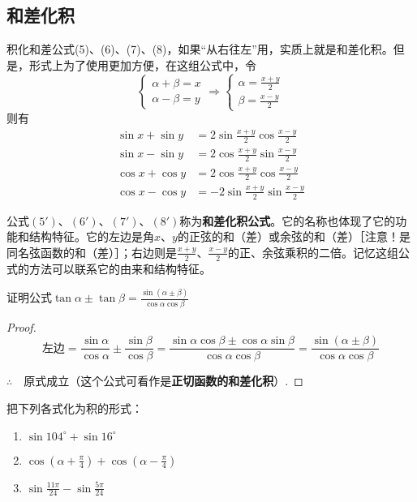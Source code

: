 \subsection{和差化积}
积化和差公式(5)、(6)、(7)、(8)，如果“从右往左”用，实质上就是和差化积。但是，形式上为了使用更加方便，在这组公式中，令
\[\begin{cases}
    \alpha+\beta=x\\
    \alpha-\beta=y
\end{cases}\Rightarrow \begin{cases}
    \alpha=\frac{x+y}{2}\\[1.5ex]
    \beta=\frac{x-y}{2}
\end{cases}\]
则有
\begin{align}
\sin x +\sin y&=2\sin\frac{x+y}{2}\cos\frac{x-y}{2} \tag{$5'$}\\
\sin x -\sin y&=2\cos\frac{x+y}{2}\sin\frac{x-y}{2} \tag{$6'$}\\
\cos x +\cos y&=2\cos\frac{x+y}{2}\cos\frac{x-y}{2} \tag{$7'$}\\
\cos x -\cos y&=-2\sin\frac{x+y}{2}\sin\frac{x-y}{2} \tag{$8'$}
\end{align}

公式$(5')$、$(6')$、$(7')$、$(8')$称为\textbf{和差化积公式}。它的名称也体现了它的功能和结构特征。它的左边是角$x$、$y$的正弦的和（差）或余弦的和（差）［注意！是同名弦函数的和（差）］；右边则是$\frac{x+y}{2}$、$\frac{x-y}{2}$的正、余弦乘积的二倍。记忆这组公式的方法可以联系它的由来和结构特征。

\begin{example}
证明公式$\tan\alpha\pm\tan\beta = \frac{\sin(\alpha\pm\beta)}{\cos\alpha\cos\beta}$
\end{example}

\begin{proof}
\[\text{左边}=\frac{\sin\alpha}{\cos\alpha}\pm\frac{\sin\beta}{\cos\beta}=\frac{\sin\alpha\cos\beta\pm\cos\alpha\sin\beta}{\cos\alpha\cos\beta}=\frac{\sin(\alpha\pm\beta)}{\cos\alpha\cos\beta}\]

$\therefore\quad $原式成立（这个公式可看作是\textbf{正切函数的和差化积}）.
\end{proof}

\begin{example}
    把下列各式化为积的形式：
\begin{multicols}{2}
\begin{enumerate}[(1)]
    \item $\sin104^{\circ}+\sin16^{\circ}$
    \item $\cos\left(\alpha+\frac{\pi}{4}\right)+\cos\left(\alpha-\frac{\pi}{4}\right)$
    \item $\sin\frac{11\pi}{24}-\sin\frac{5\pi}{24}$
\end{enumerate}
\end{multicols}
\end{example}

